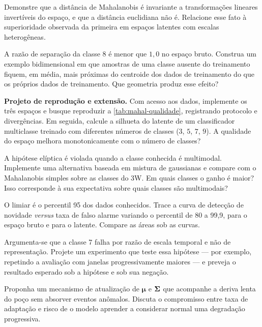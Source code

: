 \begin{exercicios}
\item Demonstre que a distância de Mahalanobis é invariante a transformações lineares
      invertíveis do espaço, e que a distância euclidiana não é. Relacione esse fato à
      superioridade observada da primeira em espaços latentes com escalas heterogêneas.

\item A razão de separação da classe 8 é menor que $1{,}0$ no espaço bruto. Construa um
      exemplo bidimensional em que amostras de uma classe ausente do treinamento fiquem,
      em média, mais próximas do centroide dos dados de treinamento do que os próprios
      dados de treinamento. Que geometria produz esse efeito?

\item \textbf{Projeto de reprodução e extensão.} Com acesso aos dados, implemente os três
      espaços e busque reproduzir a \cref{tab:mahal-qualidade}, registrando protocolo e
      divergências. Em seguida, calcule a silhueta do latente de um classificador
      multiclasse treinado com diferentes números de classes ($3$, $5$, $7$, $9$). A
      qualidade do espaço melhora monotonicamente com o número de classes?

\item A hipótese elíptica é violada quando a classe conhecida é multimodal. Implemente
      uma alternativa baseada em mistura de gaussianas e compare com o Mahalanobis
      simples sobre as classes do 3W. Em quais classes o ganho é maior? Isso corresponde
      à sua expectativa sobre quais classes são multimodais?

\item O limiar é o percentil 95 dos dados conhecidos. Trace a curva de detecção de
      novidade \emph{versus} taxa de falso alarme variando o percentil de 80 a 99{,}9,
      para o espaço bruto e para o latente. Compare as áreas sob as curvas.

\item Argumenta-se que a classe 7 falha por razão de escala temporal e não de
      representação. Projete um experimento que teste essa hipótese --- por exemplo,
      repetindo a avaliação com janelas progressivamente maiores --- e preveja o
      resultado esperado sob a hipótese e sob sua negação.

\item Proponha um mecanismo de atualização de $\bm{\mu}$ e $\bm{\Sigma}$ que acompanhe
      a deriva lenta do poço sem absorver eventos anômalos. Discuta o compromisso entre
      taxa de adaptação e risco de o modelo aprender a considerar normal uma degradação
      progressiva.
\end{exercicios}

